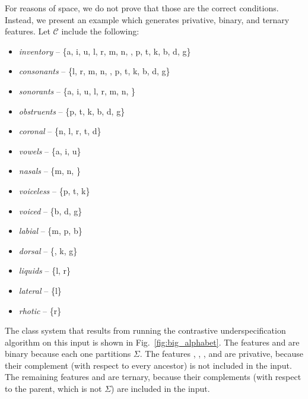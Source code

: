 \documentclass[11pt, oneside]{article}   	%
\begin{document}
\vspace{\baselineskip} For reasons of space, we do not prove that those are the correct conditions. Instead, we present an example which generates privative, binary, and ternary features. Let $\mathcal C$ include the following:
\begin{itemize}
    \item \textit{inventory} -- \{a, i, u, l, r, m, n, , p, t, k, b, d, g\}
    \item \textit{consonants} -- \{l, r, m, n, , p, t, k, b, d, g\}
    \item \textit{sonorants} -- \{a, i, u, l, r, m, n, \}
    \item \textit{obstruents} -- \{p, t, k, b, d, g\}
    \item \textit{coronal} -- \{n, l, r, t, d\}
    \item \textit{vowels} -- \{a, i, u\}
    \item \textit{nasals} -- \{m, n, \}
    \item \textit{voiceless} -- \{p, t, k\}
    \item \textit{voiced} -- \{b, d, g\}
    \item \textit{labial} -- \{m, p, b\}
    \item \textit{dorsal} -- \{, k, g\}
    \item \textit{liquids} -- \{l, r\}
    \item \textit{lateral} -- \{l\}
    \item \textit{rhotic} -- \{r\}
    \end{itemize}
The class system that results from running the contrastive underspecification algorithm on this input is shown in Fig.~\ref{fig:big_alphabet}. The features  and  are binary because each one partitions $\Sigma$. The features , , ,  and  are privative, because their complement (with respect to every ancestor) is not included in the input. The remaining features  and  are ternary, because their complements (with respect to the parent, which is not $\Sigma$) are included in the input.
\end{document}
